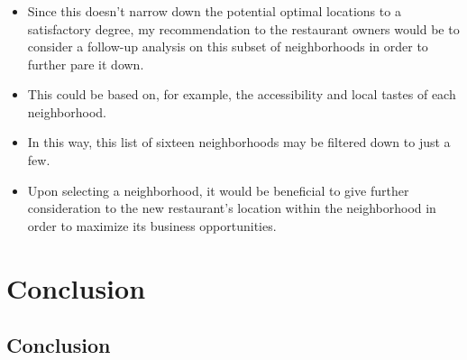 \documentclass[aspectratio=169]{beamer}
\begin{document}
\subsubsection{}
\begin{frame}
\begin{itemize}
 \item Since this doesn't narrow down the potential optimal locations to a satisfactory degree, my recommendation to the restaurant owners would be to consider a follow-up analysis on this subset of neighborhoods in order to further pare it down.
 \item This could be based on, for example, the accessibility and local tastes of each neighborhood.
 \item In this way, this list of sixteen neighborhoods may be filtered down to just a few.
 \item Upon selecting a neighborhood, it would be beneficial to give further consideration to the new restaurant's location within the neighborhood in order to maximize its business opportunities.
\end{itemize}
\end{frame}

% 


\section{Conclusion}

\subsection{Conclusion}
\end{document}
